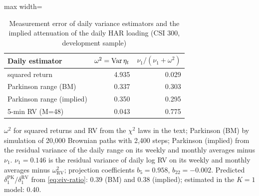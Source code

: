\begin{table}[!htbp]\centering\small
\caption{Measurement error of daily variance estimators and the implied attenuation of the daily HAR loading (CSI 300, development sample)}\label{tab:rv-measure}
\begin{adjustbox}{max width=\textwidth}
\begin{tabular}{lrr}
\toprule
Daily estimator & $\omega^2=\operatorname{Var}\eta_t$ & $\nu_1/(\nu_1+\omega^2)$\\
\midrule
squared return & 4.935 & 0.029\\
Parkinson range (BM) & 0.337 & 0.303\\
Parkinson range (implied) & 0.350 & 0.295\\
5-min RV (M=48) & 0.043 & 0.775\\
\bottomrule
\end{tabular}
\end{adjustbox}
\par\smallskip\begin{minipage}{\textwidth}\footnotesize
$\omega^2$ for squared returns and RV from the $\chi^2$ laws in the text; Parkinson (BM) by simulation of 20,000 Brownian paths with 2,400 steps; Parkinson (implied) from the residual variance of the daily range on its weekly and monthly averages minus $\nu_1$. $\nu_1=0.146$ is the residual variance of daily log RV on its weekly and monthly averages minus $\omega^2_{\mathrm{RV}}$; projection coefficients $b_5=0.958$, $b_{22}=-0.002$. Predicted $\delta_1^{\mathrm{PK}}/\delta_1^{\mathrm{RV}}$ from \eqref{eq:eiv-ratio}: 0.39 (BM) and 0.38 (implied); estimated in the $K=1$ model: 0.40.
\end{minipage}
\end{table}